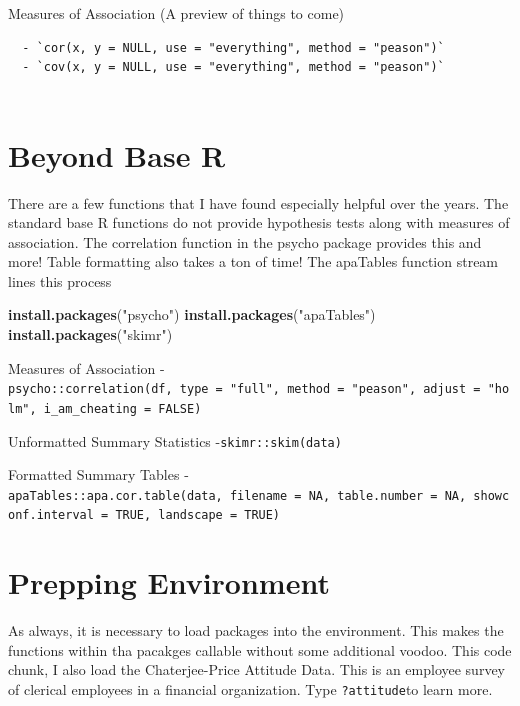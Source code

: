 \documentclass[]{book}
\newenvironment{Shaded}{\begin{snugshade}}{\end{snugshade}}
\newcommand{\KeywordTok}[1]{\textcolor[rgb]{0.13,0.29,0.53}{\textbf{#1}}}
\newcommand{\NormalTok}[1]{#1}
\newcommand{\StringTok}[1]{\textcolor[rgb]{0.31,0.60,0.02}{#1}}
\theoremstyle{definition}
\theoremstyle{definition}
\theoremstyle{definition}
\theoremstyle{remark}
\begin{document}
Measures of Association (A preview of things to come)

\begin{verbatim}
  - `cor(x, y = NULL, use = "everything", method = "peason")`
  - `cov(x, y = NULL, use = "everything", method = "peason")`
  
\end{verbatim}

\hypertarget{beyond-base-r}{%
\section{Beyond Base R}\label{beyond-base-r}}

There are a few functions that I have found especially helpful over the years. The standard base R functions do not provide hypothesis tests along with measures of association. The correlation function in the psycho package provides this and more! Table formatting also takes a ton of time! The apaTables function stream lines this process

\begin{Shaded}
\begin{Highlighting}[]
\KeywordTok{install.packages}\NormalTok{(}\StringTok{"psycho"}\NormalTok{)}
\KeywordTok{install.packages}\NormalTok{(}\StringTok{"apaTables"}\NormalTok{)}
\KeywordTok{install.packages}\NormalTok{(}\StringTok{"skimr"}\NormalTok{)}
\end{Highlighting}
\end{Shaded}

Measures of Association
- \texttt{psycho::correlation(df,\ type\ =\ "full",\ method\ =\ "peason",\ adjust\ =\ "holm",\ i\_am\_cheating\ =\ FALSE)}

Unformatted Summary Statistics
-\texttt{skimr::skim(data)}

Formatted Summary Tables
- \texttt{apaTables::apa.cor.table(data,\ filename\ =\ NA,\ table.number\ =\ NA,\ showconf.interval\ =\ TRUE,\ landscape\ =\ TRUE)}

\hypertarget{prepping-environment}{%
\section{Prepping Environment}\label{prepping-environment}}

As always, it is necessary to load packages into the environment. This makes the functions within tha pacakges callable without some additional voodoo. This code chunk, I also load the Chaterjee-Price Attitude Data. This is an employee survey of clerical employees in a financial organization. Type \texttt{?attitude}to learn more.
\end{document}
